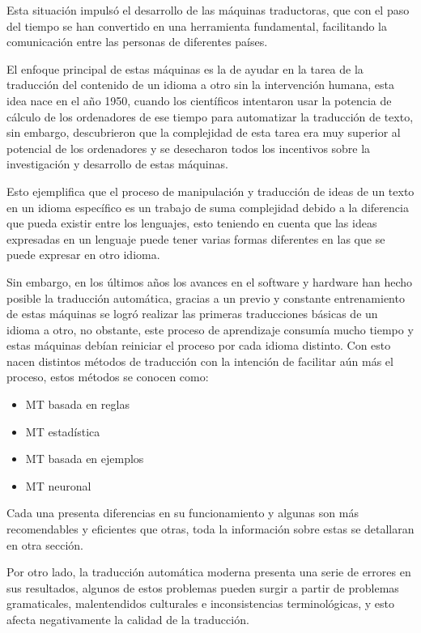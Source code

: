 \documentclass[conference]{IEEEtran}
\begin{document}
Esta situación impulsó el desarrollo de las máquinas traductoras, que con el paso del tiempo se han convertido en una herramienta fundamental, facilitando la comunicación entre las personas de diferentes países.

El enfoque principal de estas máquinas es la de ayudar en la tarea de la traducción del contenido de un idioma a otro sin la intervención humana, esta idea nace en el año 1950, cuando los científicos intentaron usar la potencia de cálculo de los ordenadores de ese tiempo para automatizar la traducción de texto, sin embargo, descubrieron que la complejidad de esta tarea era muy superior al potencial de los ordenadores y se desecharon todos los incentivos sobre la investigación y desarrollo de estas máquinas.

Esto ejemplifica que el proceso de manipulación y traducción de ideas de un texto en un idioma específico es un trabajo de suma complejidad debido a la diferencia que pueda existir entre los lenguajes, esto teniendo en cuenta que las ideas expresadas en un lenguaje puede tener varias formas diferentes en las que se puede expresar en otro idioma.

Sin embargo, en los últimos años los avances en el software y hardware han hecho posible la traducción automática, gracias a un previo y constante entrenamiento de estas máquinas se logró realizar las primeras traducciones básicas de un idioma a otro, no obstante, este proceso de aprendizaje consumía mucho tiempo y estas máquinas debían reiniciar el proceso por cada idioma distinto.
\vspace{2.0cm}
Con esto nacen distintos métodos de traducción con la intención de facilitar aún más el proceso, estos métodos se conocen como:

\begin{itemize}
    \item MT basada en reglas
    \item MT estadística
    \item MT basada en ejemplos
    \item MT neuronal
\end{itemize}

Cada una presenta diferencias en su funcionamiento y algunas son más recomendables y eficientes que otras, toda la información sobre estas se detallaran en otra sección.

Por otro lado, la traducción automática moderna presenta una serie de errores en sus resultados, algunos de estos problemas pueden surgir a partir de problemas gramaticales, malentendidos culturales e inconsistencias terminológicas, y esto afecta negativamente la calidad de la traducción.
\end{document}
